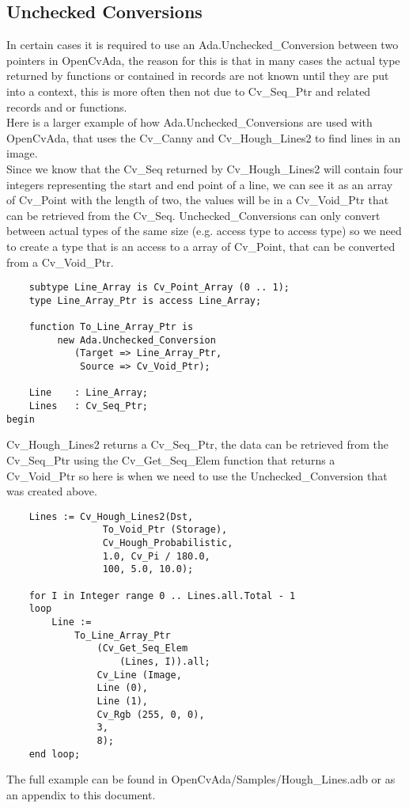 \subsection{Unchecked Conversions}
In certain cases it is required to use an Ada.Unchecked_Conversion \cite{taft2006conversion} between two pointers in OpenCvAda, the reason for this is that in many cases the actual type returned by functions or contained in records are not known until they are put into a context, this is more often then not due to Cv_Seq_Ptr and related records and or functions.
\\
Here is a larger example of how Ada.Unchecked_Conversions are used with OpenCvAda, that uses the Cv_Canny and Cv_Hough_Lines2 to find lines in an image.
\\
Since we know that the Cv_Seq returned by Cv_Hough_Lines2 will contain four integers representing the start and end point of a line, we can see it as an array of Cv_Point with the length of two, the values will be in a Cv_Void_Ptr that can be retrieved from the Cv_Seq. Unchecked_Conversions can only convert between actual types of the same size (e.g. access type to access type) so we need to create a type that is an access to a array of Cv_Point, that can be converted from a Cv_Void_Ptr.
\begin{lstlisting}
	subtype Line_Array is Cv_Point_Array (0 .. 1);
	type Line_Array_Ptr is access Line_Array;

	function To_Line_Array_Ptr is 
		 new Ada.Unchecked_Conversion 
			(Target => Line_Array_Ptr, 
			 Source => Cv_Void_Ptr);

	Line 	: Line_Array;
	Lines 	: Cv_Seq_Ptr;
begin
\end{lstlisting}
Cv_Hough_Lines2 returns a Cv_Seq_Ptr, the data can be retrieved from the Cv_Seq_Ptr using the Cv_Get_Seq_Elem function that returns a Cv_Void_Ptr so here is when we need to use the Unchecked_Conversion that was created above.
\begin{lstlisting}
	Lines := Cv_Hough_Lines2(Dst, 
				 To_Void_Ptr (Storage), 
				 Cv_Hough_Probabilistic, 
				 1.0, Cv_Pi / 180.0, 
				 100, 5.0, 10.0);

	for I in Integer range 0 .. Lines.all.Total - 1 
	loop
		Line := 
			To_Line_Array_Ptr 
				(Cv_Get_Seq_Elem 
					(Lines, I)).all;
				Cv_Line (Image, 
				Line (0), 
				Line (1), 
				Cv_Rgb (255, 0, 0), 
				3,
				8);
	end loop;
\end{lstlisting}
The full example can be found in OpenCvAda/Samples/Hough_Lines.adb or as an appendix  to this document.
